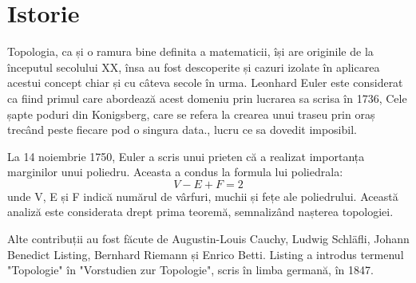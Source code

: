 \newpage
\section{Istorie}
Topologia, ca și o ramura  bine definita a matematicii, își are originile de la începutul secolului XX, 
însa au fost descoperite și cazuri izolate în aplicarea acestui concept chiar și cu câteva secole în urma. 
Leonhard Euler este considerat ca fiind primul care abordează acest domeniu prin lucrarea sa scrisa în 1736, 
Cele șapte poduri din Konigsberg, care se refera la crearea unui traseu prin oraș trecând peste fiecare pod o 
singura data., lucru ce sa dovedit imposibil.\newline

La 14 noiembrie 1750, Euler a scris unui prieten că a realizat importanța marginilor unui poliedru. 
Aceasta a condus la formula lui poliedrala: \[V-E+F=2\] unde V, E și F indică numărul de vârfuri, 
muchii și fețe ale poliedrului. Această analiză este considerata drept prima teoremă, semnalizând nașterea 
topologiei.\newline

Alte contribuții au fost făcute de Augustin-Louis Cauchy, Ludwig Schläfli, Johann Benedict Listing, 
Bernhard Riemann și Enrico Betti. Listing a introdus termenul "Topologie" în "Vorstudien zur Topologie", 
scris în limba germană, în 1847.\newline 
